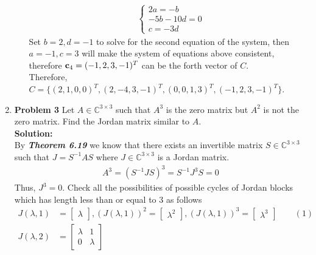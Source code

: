 \documentclass{uofa-eng-assignment}
\begin{document}
\begin{enumerate}
\begin{enumerate}
\begin{align*}
	      	      	  & \begin{cases} 
	      	      	2a  = -b \\
	      	      	-5b - 10d = 0 \\                
	      	      	c = -3d
	      	      	\end{cases}                
	      	      \end{align*}
	      	      Set $b = 2, d = -1$ to solve for the second equation of the system, then $a = -1, c = 3$ will make the system of equations above consistent, therefore $\vb{c}_4 = (-1, 2, 3, -1)^T$ can be the forth vector of $C$. \\
	      	      Therefore, $C =\{ (2, 1, 0, 0)^T, (2, -4, 3, -1)^T, (0, 0, 1 ,3)^T, (-1, 2, 3, -1)^T\}$.
	      \end{enumerate}
	\item[] \textbf{Problem 3} \newline
	      Let $A \in \mathbb{C}^{3\times 3}$ such that $A^3$ is the zero matrix but $A^2$ is not the zero matrix. Find the Jordan matrix similar to $A$.     \\       
	      \textbf{Solution:} \\
	      By \textbf{\textit{Theorem 6.19}} we know that there exists an invertible matrix $S\in \mathbb{C}^{3\times 3}$ such that $J = S^{-1}AS$ where $J \in \mathbb{C}^{3\times 3}$ is a Jordan matrix. 
	      \begin{align*}
	      	A^3 = (S^{-1}JS)^3 = S^{-1}J^3S = 0 
	      \end{align*}
	      Thus, $J^3 = 0$. Check all the possibilities of possible cycles of Jordan blocks which has length less than or equal to 3 as follows
	      \begin{align*}
	      	J(\lambda, 1) &= \begin{bmatrix}
	      	\lambda
	      	\end{bmatrix}, 
	      	(J(\lambda, 1))^2 = \begin{bmatrix}
	      	\lambda^2
	      	\end{bmatrix}      ,
	      	(J(\lambda, 1))^3 = \begin{bmatrix}
	      	\lambda^3
	      	\end{bmatrix}  \qquad (1)    \\
	      	J(\lambda, 2) &= \begin{bmatrix}
	      	\lambda & 1 \\
	      	0 &\lambda

\end{bmatrix}
\end{align*}
\end{enumerate}
\end{document}
